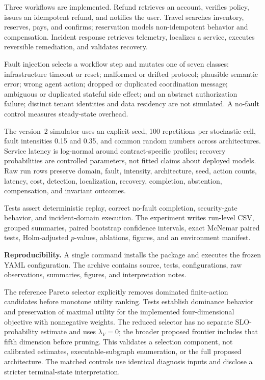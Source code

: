 \documentclass[10pt,journal,compsoc]{IEEEtran}
\begin{document}
Three workflows are implemented. Refund retrieves an account, verifies policy, issues an idempotent refund, and notifies the user. Travel searches inventory, reserves, pays, and confirms; reservation models non-idempotent behavior and compensation. Incident response retrieves telemetry, localizes a service, executes reversible remediation, and validates recovery.

Fault injection selects a workflow step and mutates one of seven classes: infrastructure timeout or reset; malformed or drifted protocol; plausible semantic error; wrong agent action; dropped or duplicated coordination message; ambiguous or duplicated stateful side effect; and an abstract authorization failure; distinct tenant identities and data residency are not simulated. A no-fault control measures steady-state overhead.

The version~2 simulator uses an explicit seed, 100 repetitions per stochastic cell, fault intensities 0.15 and 0.35, and common random numbers across architectures. Service latency is log-normal around contract-specific profiles; recovery probabilities are controlled parameters, not fitted claims about deployed models. Raw run rows preserve domain, fault, intensity, architecture, seed, action counts, latency, cost, detection, localization, recovery, completion, abstention, compensation, and invariant outcomes.

Tests assert deterministic replay, correct no-fault completion, security-gate behavior, and incident-domain execution. The experiment writes run-level CSV, grouped summaries, paired bootstrap confidence intervals, exact McNemar paired tests, Holm-adjusted $p$-values, ablations, figures, and an environment manifest.

\textbf{Reproducibility.} A single command installs the package and executes the frozen YAML configuration. The archive contains source, tests, configurations, raw observations, summaries, figures, and interpretation notes.

The reference Pareto selector explicitly removes dominated finite-action candidates before monotone utility ranking. Tests establish dominance behavior and preservation of maximal utility for the implemented four-dimensional objective with nonnegative weights. The reduced selector has no separate SLO-probability estimate and uses $\lambda_V=0$; the broader proposed frontier includes that fifth dimension before pruning. This validates a selection component, not calibrated estimates, executable-subgraph enumeration, or the full proposed architecture. The matched controls use identical diagnosis inputs and disclose a stricter terminal-state interpretation.
\end{document}
